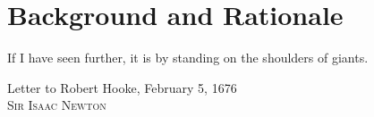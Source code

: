 %
%
\chapter{Background and Rationale}\label{ch:relatedwork}

\epigraph{ If I have seen further, it is by standing
           on the shoulders of giants. }%
         { Letter to Robert Hooke, February 5, 1676 \\
           \textsc{Sir Isaac Newton} }

%
%
%
